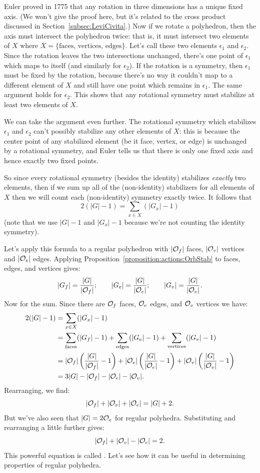 Euler proved in 1775 that any rotation in three dimensions has a unique fixed axis. (We won't give the proof here, but it's related to the cross product discussed in Section~\ref{subsec:LeviCivita}.)  Now if we  rotate a polyhedron, then the axis must intersect the polyhedron twice: that is, it must intersect two elements of $X$ where $X = \{\text{faces, vertices, edges}\}$. Let's call these two elements $\epsilon_1$ and $\epsilon_2$. Since the rotation leaves the two intersections unchanged, there's one point of $\epsilon_1$ which maps to itself (and similarly for $\epsilon_2$). If the rotation is a symmetry, then $\epsilon_1$ must be fixed by the rotation, because there's no way it couldn't map to a different element of $X$ and still have one point which remains in $\epsilon_1$. The same argument holds for $\epsilon_2$. This shows that any rotational symmetry must stabilize at least two elements of $X$. 

We can take the argument even further. The rotational symmetry which stabilizes $\epsilon_1$ and $\epsilon_2$ can't possibly stabilize any other elements of $X$: this is because the center point of any stabilized element (be it face, vertex, or edge) is unchanged by a rotational symmetry, and Euler tells us that there is only one fixed axis and hence exactly two fixed points.  

So since every rotational symmetry (besides the identity) stabilizes \emph{exactly} two elements, then if we sum up all of the (non-identity) stabilizers for all elements of $X$ then we will count each (non-identity) symmetry exactly twice. It follows that
\[ 2(|G|-1) = \sum_{x \in X}  (|G_x|-1) \]
(note that we use $|G|-1$ and $|G_x|-1$  because we're not counting the identity symmetry). 


Let's apply this formula to a regular polyhedron with $|{\cal O}_f|$ faces, $|{\cal O}_v|$ vertices and $|{\cal O}_e|$ edges.  Applying Proposition~\ref{proposition:actions:OrbStab} to faces, edges, and vertices gives:
\[ |G_f|=\frac{|G|}{|{\cal O}_f|}; \qquad |G_e|=\frac{|G|}{|{\cal O}_e|}; \qquad |G_v|=\frac{|G|}{|{\cal O}_v|}.\]
Now for the sum.  Since there are ${\cal O}_f$ faces, ${\cal O}_e$ edges, and ${\cal O}_v$ vertices we have:
\begin{align*}
2 (|G| -1) &=  \sum_{x \in X}  (|G_x|-1)\\
&=  \sum_{\text{faces}}  (|G_f|-1)+\sum_{\text{edges}}  (|G_e|-1)+\sum_{\text{vertices}}  (|G_v|-1)\\
&= |{\cal O}_f|  \left(\frac{|G|}{|{\cal O}_f|}-1\right)+ |{\cal O}_e| \left(\frac{|G|}{|{\cal O}_e|}-1\right)+  |{\cal O}_v|\left(\frac{|G|}{|{\cal O}_v|}-1\right)\\
&=  3|G| - |{\cal O}_f| -  |{\cal O}_e| -  |{\cal O}_v|.
\end{align*}
Rearranging, we find:
\[ |{\cal O}_f| +  |{\cal O}_v|  +  |{\cal O}_e| =  |G|+2. \]
But we've also seen that $|G| = 2{\cal O}_e$ for regular polyhedra. Substituting and rearranging a little further gives:
\[ |{\cal O}_f|+|{\cal O}_v|-|{\cal O}_e|=2. \]
This powerful equation is called .  Let's see how it can be useful in determining properties of regular polyhedra.


